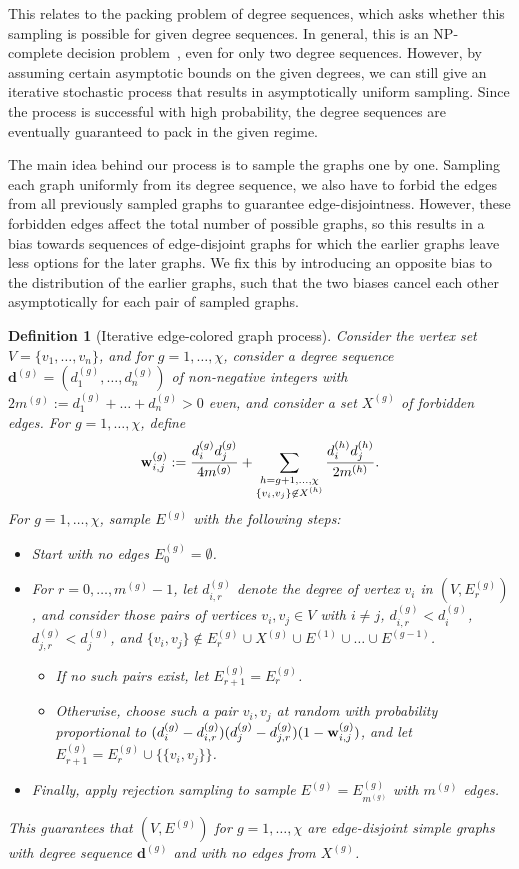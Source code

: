 \documentclass{article}
\theoremstyle{plain}
\theoremstyle{remark}
\theoremstyle{plain}
\newtheorem{definition}[theorem]{Definition}
\numberwithin{equation}{section}
\renewcommand{\d}{{\boldsymbol{d}}}
\renewcommand{\b}{{\bf{w}}}
\begin{document}
	This relates to the packing problem of degree sequences, which asks whether this sampling is possible for given degree sequences. In general, this is an NP-complete decision problem~\cite{West2012}, even for only two degree sequences. However, by assuming certain asymptotic bounds on the given degrees, we can still give an iterative stochastic process that results in asymptotically uniform sampling. Since the process is successful with high probability, the degree sequences are eventually guaranteed to pack in the given regime.
	
	The main idea behind our process is to sample the graphs one by one. Sampling each graph uniformly from its degree sequence, we also have to forbid the edges from all previously sampled graphs to guarantee edge-disjointness. However, these forbidden edges affect the total number of possible graphs, so this results in a bias towards sequences of edge-disjoint graphs for which the earlier graphs leave less options for the later graphs. We fix this by introducing an opposite bias to the distribution of the earlier graphs, such that the two biases cancel each other asymptotically for each pair of sampled graphs.
	
	\begin{definition}[Iterative edge-colored graph process]
		Consider the vertex set $V=\{v_1,\ldots,v_n\}$, and for $g=1,\ldots,\chi$, consider a degree sequence $\d^{(g)}=(d_1^{(g)},\ldots,d_n^{(g)})$ of non-negative integers with $2m^{(g)}:=d_1^{(g)}+\ldots+d_n^{(g)}>0$ even, and consider a set $X^{(g)}$ of forbidden edges. For $g=1,\ldots,\chi$, define $$\b^{(g)}_{i,j}:=\frac{d_i^{(g)}d_j^{(g)}}{4m^{(g)}}+\sum_{\substack{h=g+1,\ldots,\chi\\\{v_i,v_j\}\not\in X^{(h)}}}\frac{d_i^{(h)}d_j^{(h)}}{2m^{(h)}}.$$ For $g=1,\ldots,\chi$, sample $E^{(g)}$ with the following steps:
		\begin{itemize}
			\item Start with no edges $E_0^{(g)}=\emptyset$.
			\item For $r=0,\ldots,m^{(g)}-1$, let $d_{i,r}^{(g)}$ denote the degree of vertex $v_i$ in $(V,E_r^{(g)})$, and consider those pairs of vertices $v_i,v_j\in V$ with $i\neq j$, $d_{i,r}^{(g)}<d_i^{(g)}$, $d_{j,r}^{(g)}<d_j^{(g)}$, and $\{v_i,v_j\}\not\in E_r^{(g)}\cup X^{(g)}\cup E^{(1)}\cup\ldots\cup E^{(g-1)}$.
			\begin{itemize}
				\item If no such pairs exist, let $E_{r+1}^{(g)}=E_r^{(g)}$.
				\item Otherwise, choose such a pair $v_i,v_j$ at random with probability proportional to $(d_i^{(g)}-d_{i,r}^{(g)})(d_j^{(g)}-d_{j,r}^{(g)})(1-\b^{(g)}_{i,j})$, and let $E_{r+1}^{(g)}=E_r^{(g)}\cup\{\{v_i,v_j\}\}$.
			\end{itemize}
			\item Finally, apply rejection sampling to sample $E^{(g)}=E_{m^{(g)}}^{(g)}$ with $m^{(g)}$ edges.
		\end{itemize}
		This guarantees that $(V,E^{(g)})$ for $g=1,\ldots,\chi$ are edge-disjoint simple graphs with degree sequence $\d^{(g)}$ and with no edges from $X^{(g)}$.
	\end{definition}
	
\end{document}
